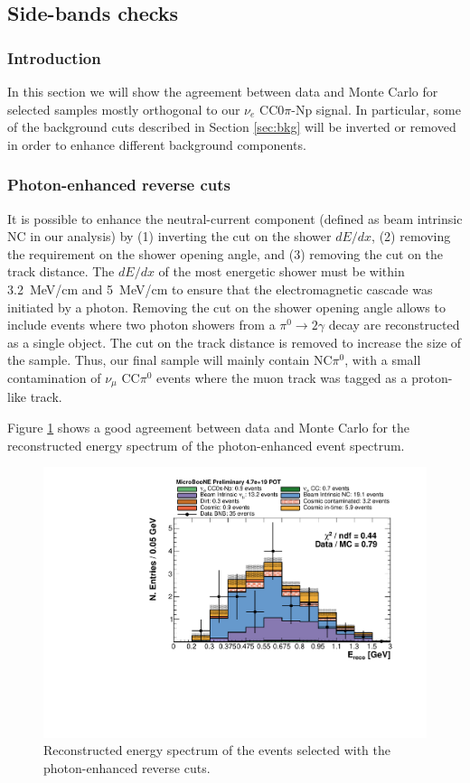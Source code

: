 \subsection{Side-bands checks}
\subsubsection{Introduction}
In this section we will show the agreement between data and Monte Carlo for selected samples mostly orthogonal to our $\nu_{e}$ CC0$\pi$-Np signal. In particular, some of the background cuts described in Section \ref{sec:bkg} will be inverted or removed in order to enhance different background components.

\subsubsection{Photon-enhanced reverse cuts}
It is possible to enhance the neutral-current component (defined as beam intrinsic NC in our analysis) by (1) inverting the cut on the shower $dE/dx$, (2) removing the requirement on the shower opening angle, and (3) removing the cut on the track distance. The $dE/dx$ of the most energetic shower must be within 3.2~MeV/cm and 5~MeV/cm to ensure that the electromagnetic cascade was initiated by a photon. Removing the cut on the shower opening angle allows to include events where two photon showers from a $\pi^{0}\rightarrow 2\gamma$ decay are reconstructed as a single object. The cut on the track distance is removed to increase the size of the sample.
Thus, our final sample will mainly contain NC$\pi^{0}$, with a small contamination of $\nu_{\mu}$ CC$\pi^{0}$ events where the muon track was tagged as a proton-like track.

Figure \ref{fig:photon} shows a good agreement between data and Monte Carlo for the reconstructed energy spectrum of the photon-enhanced event spectrum.

\begin{figure}[htbp]
\centering
  \includegraphics[width=0.65\linewidth]{figures/nc_reco.pdf}
  \caption{Reconstructed energy spectrum of the events selected with the photon-enhanced reverse cuts.}\label{fig:photon}
\end{figure}

